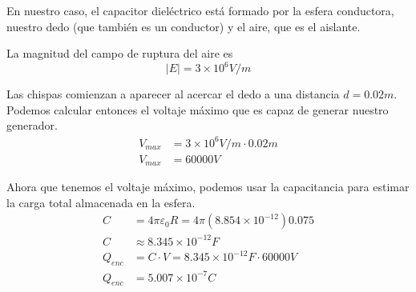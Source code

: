\documentclass[12pt]{article}
\begin{document}
En nuestro caso, el capacitor dieléctrico está formado por la esfera conductora, nuestro dedo (que también es un conductor) y el aire, que es el aislante.

La magnitud del campo de ruptura del aire es 
\[
  \left|E\right| = 3\times 10^6 V/m
\]

Las chispas comienzan a aparecer al acercar el dedo a una distancia $ d=0.02m $. Podemos calcular entonces el voltaje máximo que es capaz de generar nuestro generador.
\begin{align*}
V_{max} &= 3\times 10^6V/m\cdot 0.02m\\
V_{max} &= 60000V
\end{align*}

Ahora que tenemos el voltaje máximo, podemos usar la capacitancia para estimar la carga total almacenada en la esfera.
\begin{align*}
  C &= 4\pi\varepsilon_0R = 4\pi(8.854\times 10^{-12})0.075\\
  C &\approx 8.345\times 10^{-12}F\\
  Q_{enc} &= C\cdot V = 8.345\times 10^{-12}F \cdot 60000V\\
  Q_{enc} &= 5.007\times 10^{-7}C
\end{align*}






\end{document}
